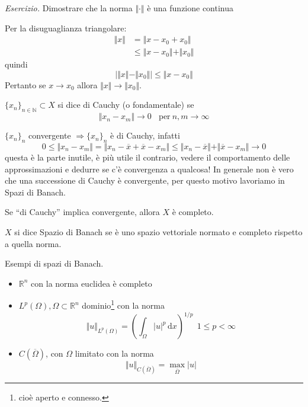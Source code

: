 \documentclass[10pt,a4paper,twoside,openright]{book}
\newcommand{\de}{\,\mathrm d}
\newcommand{\dx}{\de x}
\begin{document}
\textit{Esercizio.} Dimostrare che la norma $\Vert \cdotp \Vert $ è una funzione continua

Per la disuguaglianza triangolare:
\begin{align*}
	\Vert x\Vert  & =\Vert x-x_{0} +x_{0}\Vert \\
 				& \leqslant \Vert x-x_{0}\Vert +\Vert x_{0}\Vert 
\end{align*}
quindi
\begin{equation*}
	\Big| \Vert x\Vert -\Vert x_{0}\Vert \Big|\leqslant \Vert x-x_{0}\Vert 
\end{equation*}
Pertanto se $x\rightarrow x_{0}$ allora $\Vert x\Vert \rightarrow \Vert x_{0}\Vert $.

\begin{definition}
	$\{x_{n}\}_{n\in \mathbb{N}} \subset X$ si dice di Cauchy (o fondamentale) se
	\begin{equation*}
		\Vert x_{n} -x_{m}\Vert \rightarrow 0\ \ \ \ \text{per} \ n,m\rightarrow \infty 
	\end{equation*}
\end{definition}
$\{x_{n}\}_{n}$ convergente $\Rightarrow \{x_{n}\}_{n}$ è di Cauchy, infatti
\begin{equation*}
	0\leqslant \Vert x_{n} -x_{m}\Vert =\Vert x_{n} -\overline{x} +\overline{x} -x_{m}\Vert \leqslant \Vert x_{n} -\overline{x}\Vert +\Vert \overline{x} -x_{m}\Vert \rightarrow 0
\end{equation*}
questa è la parte inutile, è più utile il contrario, vedere il comportamento delle approssimazioni e dedurre se c'è convergenza a qualcosa! In generale non è vero che una successione di Cauchy è convergente, per questo motivo lavoriamo in Spazi di Banach.
\begin{definition}
	Se ``di Cauchy'' implica convergente, allora $X$ è completo.
\end{definition}
\begin{definition}
	$X$ si dice Spazio di Banach se è uno spazio vettoriale normato e completo rispetto a quella norma.
\end{definition}
Esempi di spazi di Banach.
\begin{itemize}
	\item $\mathbb{R}^{n}$ con la norma euclidea è completo
	\item $L^{p}(\Omega),\Omega \subset \mathbb{R}^{n}$ dominio\footnote{cioè aperto e connesso.} con la norma
	\begin{equation*}
	      \Vert u\Vert _{L^{p}(\Omega)} =\left(\int _{\Omega }| u| ^{p} \dx\right)^{1/p} \ \ 1\leqslant p< \infty 
	\end{equation*}
	\item $C(\overline{\Omega })$, con $\Omega $ limitato con la norma
	\begin{equation*}
	      \Vert u\Vert _{C(\overline{\Omega })} =\max_{\overline{\Omega }}| u| 
	\end{equation*}
\end{itemize}
\end{document}
